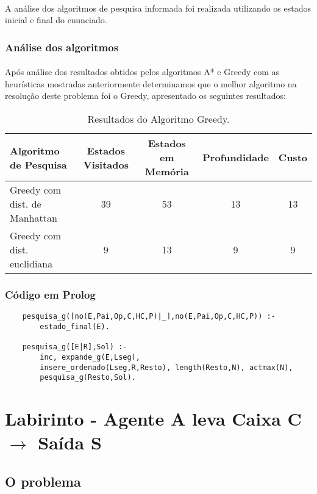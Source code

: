 \documentclass{article}
\begin{document}
\paragraph{} A análise dos algoritmos de pesquisa informada foi realizada utilizando os estados inicial e final do enunciado.

\subsubsection{Análise dos algoritmos}
\paragraph{} Após análise dos resultados obtidos pelos algoritmos A* e Greedy com as heurísticas mostradas anteriormente determinamos que o melhor algoritmo na resolução deste problema foi o Greedy, apresentado os seguintes resultados:

\begin{table}[H]
\centering
\begin{tabular}{l|c|c|c|c}
Algoritmo de Pesquisa & Estados Visitados & Estados em Memória & Profundidade & Custo \\\hline
Greedy com dist. de Manhattan & 39 & 53 & 13 & 13 \\\hline
Greedy com dist. euclidiana & 9 & 13 & 9 & 9 
\end{tabular}
\caption{\label{tab:pni}Resultados do Algoritmo Greedy.}
\end{table}

\subsubsection{Código em Prolog}
\begin{verbatim}
    pesquisa_g([no(E,Pai,Op,C,HC,P)|_],no(E,Pai,Op,C,HC,P)) :-        
        estado_final(E).
        
    pesquisa_g([E|R],Sol) :- 
        inc, expande_g(E,Lseg),
        insere_ordenado(Lseg,R,Resto), length(Resto,N), actmax(N),
        pesquisa_g(Resto,Sol).
\end{verbatim}

\newpage

\section{Labirinto - Agente A leva Caixa C $\rightarrow$ Saída S}
\subsection{O problema}
\end{document}
